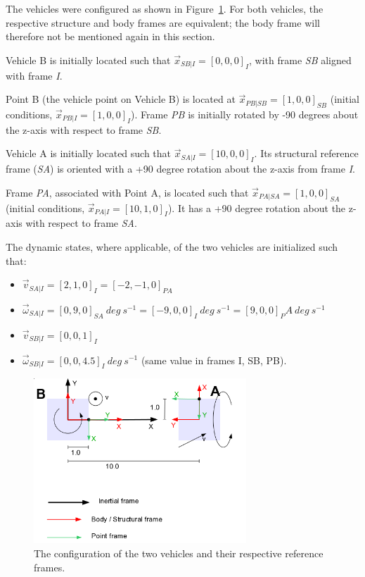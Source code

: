 \begin{description}
The vehicles were configured as shown in Figure~\ref{fig:Relative_config}.  For
both vehicles, the respective structure and body frames are equivalent; the body frame will 
therefore not be mentioned again in this section.  

Vehicle B
is initially located such that $\vec x_{SB|I} = [0,0,0]_I$, with frame \textit{SB} aligned
with frame \textit{I}.  


Point B (the vehicle point on Vehicle B) is located at \newline
$\vec x_{PB|SB} = [1,0,0]_{SB}$ (initial conditions, $\vec x_{PB|I} = [1,0,0]_I$).
Frame \textit{PB} is initially rotated by -90 degrees
 about the z-axis with respect to frame \textit{SB}.

 Vehicle A is initially located such that $\vec x_{SA|I} = [10, 0, 0]_I$.  Its structural
 reference frame (\textit{SA}) is oriented with a +90 degree rotation about the z-axis from
 frame \textit{I}.  
 
 Frame \textit{PA}, associated with Point A,
 is located such that $\vec x_{PA|SA} = [1, 0, 0]_{SA}$ (initial conditions, $\vec x_{PA|I} =[10,1,0]_I$).
 It has a +90 degree rotation about the z-axis with respect to frame \textit{SA}.

 The dynamic states, where applicable, of the two vehicles are initialized such that:
 \begin{itemize}
   \item $\vec v_{SA|I} = [2 , 1 , 0 ]_I = [-2 , -1 , 0]_{PA}$
   \item $\vec \omega_{SA|I} = [0 , 9 , 0]_{SA}\ deg\ s^{-1} = [-9 ,
   0 , 0]_I\ deg\ s^{-1} = [9 , 0 , 0]_PA\ deg\ s^{-1}$
   \item $\vec v_{SB|I} = [0 , 0 , 1]_I$
   \item $\vec \omega_{SB|I} = [0 , 0 , 4.5]_I\ deg\ s^{-1}$ (same value in frames I,
   SB, PB).
 \end{itemize}

\begin{figure}[!ht]
 \begin{center}
  \includegraphics[width=80mm]{figures/relative_config.png}
  \caption{The configuration of the two vehicles and their respective reference frames.} 
  \label{fig:Relative_config}
 \end{center}
\end{figure}



\end{description}
